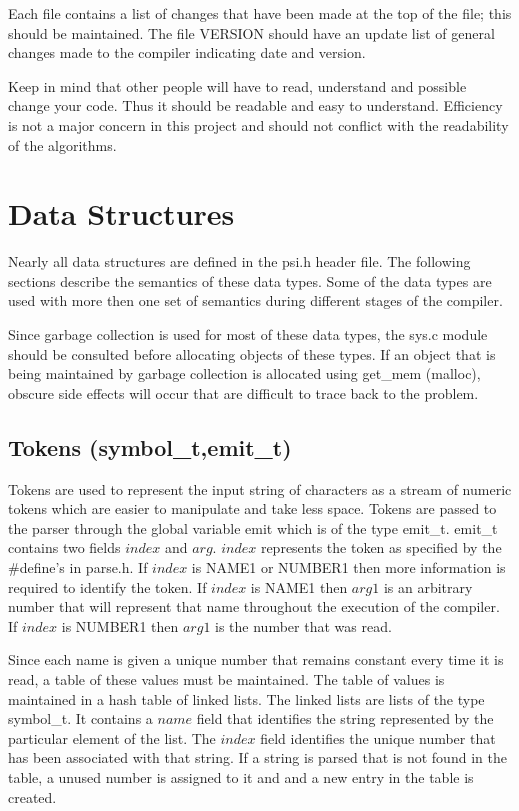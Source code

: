 Each file contains a list of changes that have been made at the top of the
file; this should be maintained.  The file VERSION should have an update
list of general changes made to the compiler indicating date and version.

Keep in mind that other people will have to read, understand and possible
change your code.  Thus it should be readable and easy to understand.
Efficiency is not a major concern in this project and should not conflict
with the readability of the algorithms.

\section{Data Structures}
Nearly all data structures are defined in the psi.h header file.  The following
sections describe the semantics of these data types.  Some of the data types
are used with more then one set of semantics during different stages of the
compiler.

Since garbage collection is used for most of these data types, the sys.c 
module should be consulted before allocating objects of these types.  If
an object that is being maintained by garbage collection is allocated using
get\_mem (malloc), obscure side effects will occur that are difficult to 
trace back to the problem.

\subsection{Tokens (symbol\_t,emit\_t)}
Tokens are used to represent the input string of characters as a stream
of numeric tokens which are easier to manipulate and take less space.
Tokens are passed to the parser through the global variable emit which
is of the type emit\_t.  emit\_t contains two fields $index$ and $arg$.
$index$ represents the token as specified by the \#define's in parse.h.
If $index$ is NAME1 or NUMBER1 then more information is required to 
identify the token.  If $index$ is NAME1 then $arg1$ is an arbitrary number
that will represent that name throughout the execution of the compiler.
If $index$ is NUMBER1 then $arg1$ is the number that was read.

Since each name is given a unique number that remains constant every time it
is read, a table of these values must be maintained.  The table of values
is maintained in a hash table of linked lists.  The linked lists are lists
of the type symbol\_t.  It contains a $name$ field that identifies the string
represented by the particular element of the list.  The $index$ field 
identifies
the unique number that has been associated with that string.  If a string
is parsed that is not found in the table, a unused number is assigned to it
and and a new entry in the table is created.

